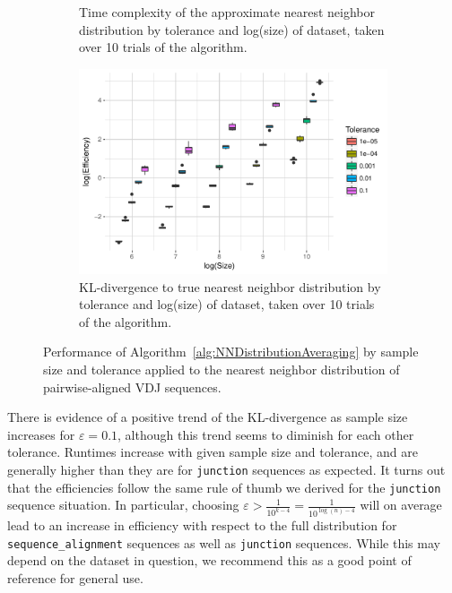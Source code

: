 \documentclass{article}
\begin{document}
\begin{figure}
\begin{subfigure}{0.5\textwidth}
    	\caption{Time complexity of the approximate nearest neighbor distribution by tolerance and log(size) of dataset, taken over 10 trials of the algorithm.}
    	\label{fig:NNTimeBySizeFull}
    \end{subfigure}
    \begin{subfigure}{0.5\textwidth}
        \includegraphics[width=\linewidth]{Figures/NearestNeighbor/Sequence/efficiency_by_size_and_tol.pdf}
    	\caption{KL-divergence to true nearest neighbor distribution by tolerance and log(size) of dataset, taken over 10 trials of the algorithm.}
    	\label{fig:NNEfficiencyBySizeFull}
    \end{subfigure}
     \caption{Performance of Algorithm~\ref{alg:NNDistributionAveraging} by sample size and tolerance applied to the nearest neighbor distribution of pairwise-aligned VDJ sequences.}
\end{figure}
There is evidence of a positive trend of the KL-divergence as sample size increases for $\varepsilon = 0.1$, although this trend seems to diminish for each other tolerance.
Runtimes increase with given sample size and tolerance, and are generally higher than they are for \texttt{junction} sequences as expected.
It turns out that the efficiencies follow the same rule of thumb we derived for the \texttt{junction} sequence situation.
In particular, choosing $\varepsilon > \frac{1}{10^{k - 4}} = \frac{1}{10^{\log(n) - 4}}$ will on average lead to an increase in efficiency with respect to the full distribution for \texttt{sequence\_alignment} sequences as well as \texttt{junction} sequences.
While this may depend on the dataset in question, we recommend this as a good point of reference for general use.
\end{document}
